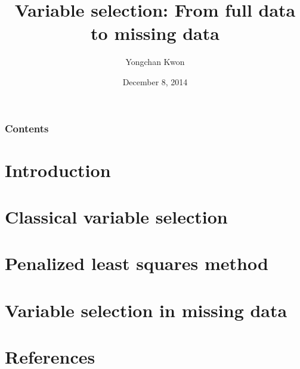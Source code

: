\documentclass{beamer}
\title[Missing data seminar]{Variable selection: From full data to missing data} %
\author[Yongchan Kwon]{Yongchan Kwon} %
\institute[] %
{
\textit{Department of Statistics, Seoul National University, Seoul,  Korea}
}
\date{December 8, 2014} %
\begin{document}
\begin{frame}
\titlepage %
\end{frame}

\begin{frame}
\frametitle{Contents} %
\tableofcontents %
\end{frame}


\section{Introduction}
\section{Classical variable selection}
\section{Penalized least squares method}
\section{Variable selection in missing data}
\section{References}

\end{document}
